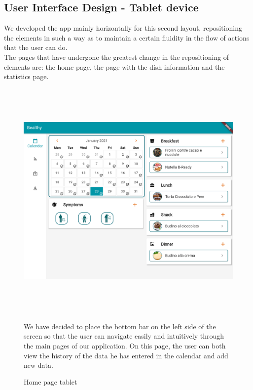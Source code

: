 \documentclass [12pt]{article}
\begin{document}
\clearpage


\subsection{User Interface Design - Tablet device}
We developed the app mainly horizontally for this second layout, repositioning the elements in such a way as to maintain a certain fluidity in the flow of actions that the user can do.\\
The pages that have undergone the greatest change in the repositioning of elements are: the home page, the page with the dish information and the statistics page.
\begin{figure}[h!]
\centering
\includegraphics[width=\linewidth,height=12cm]{HomePageHorizontal.png}
\caption{Home page tablet}
\medskip
\small
We have decided to place the bottom bar on the left side of the screen so that the user can navigate easily and intuitively through the main pages of our application. On this page, the user can both view the history of the data he has entered in the calendar and add new data.
\end{figure}
\end{document}
